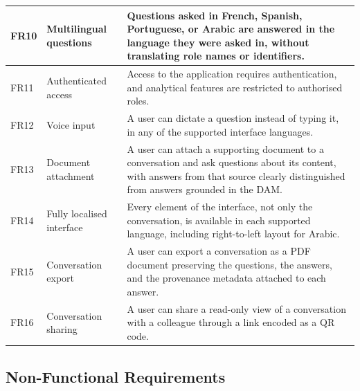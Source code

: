 \begin{longtable}{|p{}|p{}|p{}|}
FR10 & Multilingual questions & Questions asked in French, Spanish, Portuguese, or Arabic are answered in the language they were asked in, without translating role names or identifiers. \\ \hline
FR11 & Authenticated access & Access to the application requires authentication, and analytical features are restricted to authorised roles. \\ \hline
FR12 & Voice input & A user can dictate a question instead of typing it, in any of the supported interface languages. \\ \hline
FR13 & Document attachment & A user can attach a supporting document to a conversation and ask questions about its content, with answers from that source clearly distinguished from answers grounded in the DAM. \\ \hline
FR14 & Fully localised interface & Every element of the interface, not only the conversation, is available in each supported language, including right-to-left layout for Arabic. \\ \hline
FR15 & Conversation export & A user can export a conversation as a PDF document preserving the questions, the answers, and the provenance metadata attached to each answer. \\ \hline
FR16 & Conversation sharing & A user can share a read-only view of a conversation with a colleague through a link encoded as a QR code. \\ \hline
\end{longtable}

\subsection{Non-Functional Requirements}

